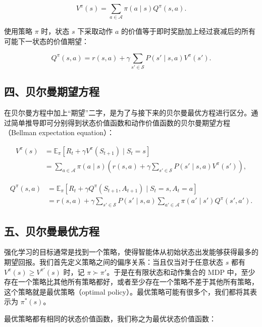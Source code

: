 \[
V^{\pi}(s)=\sum_{a\in\mathcal{A}}\pi(a\mid s)Q^{\pi}(s,a).
\]

使用策略 \(\pi\) 时，状态 \(s\) 下采取动作 \(a\) 的价值等于即时奖励加上经过衰减后的所有可能下一状态的价值期望：

\[
Q^{\pi}(s,a)=r(s,a)+\gamma\sum_{s'\in\mathcal{S}}P(s'\mid s,a)V^{\pi}(s').
\]

\hypertarget{ux56dbux8d1dux5c14ux66fcux671fux671bux65b9ux7a0b}{%
\subsection{四、贝尔曼期望方程}\label{ux56dbux8d1dux5c14ux66fcux671fux671bux65b9ux7a0b}}

在贝尔曼方程中加上``期望''二字，是为了与接下来的贝尔曼最优方程进行区分。通过简单推导即可分别得到状态价值函数和动作价值函数的贝尔曼期望方程（Bellman expectation equation）：

\[
\begin{aligned}
V^{\pi}(s)
&=\mathbb{E}_{\pi}[R_t+\gamma V^{\pi}(S_{t+1})\mid S_t=s]\\
&=\sum_{a\in\mathcal{A}}\pi(a\mid s)
(r(s,a)+\gamma\sum_{s'\in\mathcal{S}}P(s'\mid s,a)V^{\pi}(s')),
\end{aligned}
\]

\[
\begin{aligned}
Q^{\pi}(s,a)
&=\mathbb{E}_{\pi}[R_t+\gamma Q^{\pi}(S_{t+1},A_{t+1})\mid S_t=s,A_t=a]\\
&=r(s,a)+\gamma\sum_{s'\in\mathcal{S}}P(s'\mid s,a)
\sum_{a'\in\mathcal{A}}\pi(a'\mid s')Q^{\pi}(s',a').
\end{aligned}
\]

\hypertarget{ux4e94ux8d1dux5c14ux66fcux6700ux4f18ux65b9ux7a0b}{%
\subsection{五、贝尔曼最优方程}\label{ux4e94ux8d1dux5c14ux66fcux6700ux4f18ux65b9ux7a0b}}

强化学习的目标通常是找到一个策略，使得智能体从初始状态出发能够获得最多的期望回报。我们首先定义策略之间的偏序关系：当且仅当对于任意状态 \(s\) 都有 \(V^{\pi}(s)\ge V^{\pi'}(s)\) 时，记 \(\pi\succ \pi'\)。于是在有限状态和动作集合的 MDP 中，至少存在一个策略比其他所有策略都好，或者至少存在一个策略不差于其他所有策略，这个策略就是最优策略（optimal policy）。最优策略可能有很多个，我们都将其表示为 \(\pi^{*}(s)\)。

最优策略都有相同的状态价值函数，我们称之为最优状态价值函数：

